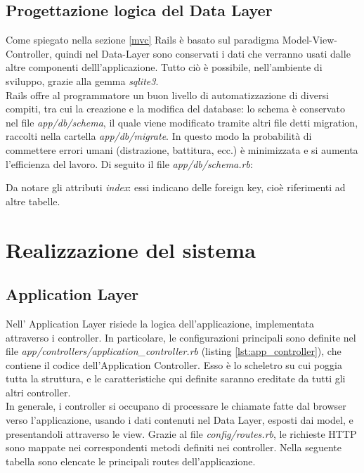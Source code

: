 \documentclass[Lau, binding=0.6cm, oneside]{sapthesis}
\begin{document}
\section{Progettazione logica del Data Layer}

Come spiegato nella sezione \ref{mvc} Rails è basato sul paradigma Model-View-Controller, quindi nel Data-Layer sono conservati i dati che verranno usati dalle altre componenti delll'applicazione. Tutto ciò è possibile, nell'ambiente di sviluppo, grazie alla gemma \textit{sqlite3}.\\
Rails offre al programmatore un buon livello di automatizzazione di diversi compiti, tra cui la creazione e la modifica del database: lo schema è conservato nel file \textit{app/db/schema}, il quale viene modificato tramite altri file detti migration, raccolti nella cartella \textit{app/db/migrate}.
In questo modo la probabilità di commettere errori umani (distrazione, battitura, ecc.) è minimizzata e si aumenta l'efficienza del lavoro.
Di seguito il file \textit{app/db/schema.rb}:



Da notare gli attributi \textit{index}: essi indicano delle foreign key, cioè riferimenti ad altre tabelle.

\chapter{Realizzazione del sistema}

\section{Application Layer}

Nell' Application Layer risiede la logica dell'applicazione, implementata attraverso i controller. In particolare, le configurazioni principali sono definite nel file \textit{app/controllers/application\_controller.rb} (listing \ref{lst:app_controller}), che contiene il codice dell'Application Controller. Esso è lo scheletro su cui poggia tutta la struttura, e le caratteristiche qui definite saranno ereditate da tutti gli altri controller.\\
In generale, i controller si occupano di processare le chiamate fatte dal browser verso l'applicazione, usando i dati contenuti nel Data Layer, esposti dai model, e presentandoli attraverso le view. Grazie al file \textit{config/routes.rb}, le richieste HTTP sono mappate nei correspondenti metodi definiti nei controller. Nella seguente tabella sono elencate le principali routes dell'applicazione. 
\end{document}
